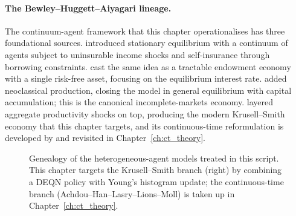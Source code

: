 \documentclass[11pt,a4paper]{report}
\begin{document}
\paragraph{The Bewley--Huggett--Aiyagari lineage.}  The continuum-agent framework that this chapter operationalises has three foundational sources.  \citet{bewley1986stationary} introduced stationary equilibrium with a continuum of agents subject to uninsurable income shocks and self-insurance through borrowing constraints.  \citet{huggett1993riskfree} cast the same idea as a tractable endowment economy with a single risk-free asset, focusing on the equilibrium interest rate.  \citet{Aiyagari} added neoclassical production, closing the model in general equilibrium with capital accumulation; this is the canonical incomplete-markets economy.  \citet{krusell1998income} layered aggregate productivity shocks on top, producing the modern Krusell--Smith economy that this chapter targets, and its continuous-time reformulation is developed by \citet{achdou2022income} and revisited in Chapter~\ref{ch:ct_theory}.

\begin{figure}[ht]
\centering
{}
\caption{Genealogy of the heterogeneous-agent models treated in this script.  This chapter targets the Krusell--Smith branch (right) by combining a DEQN policy with Young's histogram update; the continuous-time branch (Achdou--Han--Lasry--Lions--Moll) is taken up in Chapter~\ref{ch:ct_theory}.}
\label{fig:bewley_lineage}
\end{figure}
\end{document}
